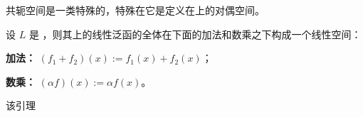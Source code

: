 
共轭空间是一类特殊的，特殊在它是定义在上的对偶空间。

\begin{lemma}{}
设 $L$ 是 ，则其上的线性泛函的全体在下面的加法和数乘之下构成一个线性空间：

\textbf{加法：} $(f_1+f_2)(x):=f_1(x)+f_2(x)$；

\textbf{数乘：} $(\alpha f)(x):=\alpha f(x)$。
\end{lemma}
该引理
